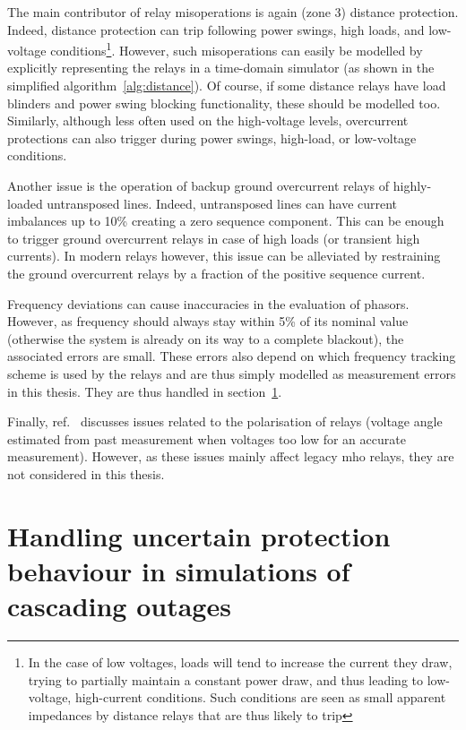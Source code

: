 The main contributor of relay misoperations is again (zone 3) distance protection. Indeed, distance protection can trip following power swings, high loads, and low-voltage conditions\footnote{In the case of low voltages, loads will tend to increase the current they draw, trying to partially maintain a constant power draw, and thus leading to low-voltage, high-current conditions. Such conditions are seen as small apparent impedances by distance relays that are thus likely to trip}. However, such misoperations can easily be modelled by explicitly representing the relays in a time-domain simulator (as shown in the simplified algorithm~\ref{alg:distance}). Of course, if some distance relays have load blinders and power swing blocking functionality, these should be modelled too. Similarly, although less often used on the high-voltage levels, overcurrent protections can also trigger during power swings, high-load, or low-voltage conditions.

Another issue is the operation of backup ground overcurrent relays of highly-loaded untransposed lines. Indeed, untransposed lines can have current imbalances up to 10\% creating a zero sequence component. This can be enough to trigger ground overcurrent relays in case of high loads (or transient high currents). In modern relays however, this issue can be alleviated by restraining the ground overcurrent relays by a fraction of the positive sequence current.

Frequency deviations can cause inaccuracies in the evaluation of phasors. However, as frequency should always stay within 5\% of its nominal value (otherwise the system is already on its way to a complete blackout), the associated errors are small. These errors also depend on which frequency tracking scheme is used by the relays and are thus simply modelled as measurement errors in this thesis. They are thus handled in section~\ref{sec:protection_uncertainty}.

Finally, ref.~\cite{ProtectionFailuresDemetrios, PSRCreportProtectionMisop, PSRCreportSummaryProtectionMisop} discusses issues related to the polarisation of relays (voltage angle estimated from past measurement when voltages too low for an accurate measurement). However, as these issues mainly affect legacy mho relays, they are not considered in this thesis.



\section{Handling uncertain protection behaviour in simulations of cascading outages}
\label{sec:protection_uncertainty}

